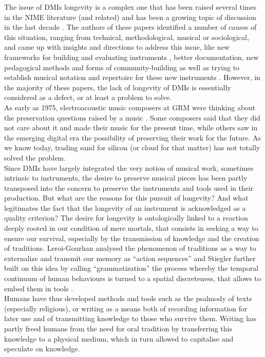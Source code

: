 The issue of DMIs longevity is a complex one that has been raised several times in the \gls{NIME} literature (and related) and has been a growing topic of discussion in the last decade \cite{baguyos_contemporary_2014}\cite{morreale_design_2017}. The authors of these papers identified a number of causes of this situation, ranging from technical, methodological, musical or sociological, and came up with insights and directions to address this issue, like new frameworks for building and evaluating instruments  \cite{jorda_digital_2004} \cite{morreale_design_2017}, better documentation, new pedagogical methods and forms of community-building as well as trying to establish musical notation and repertoire for these new instruments \cite{mamedes_composing_2014}\cite{mays_notation_2014}. However, in the majority of these papers, the lack of longevity of DMIs is essentially considered as a defect, or at least a problem to solve.\\
\indent As early as 1975, electroacoustic music composers at \gls{GRM} were thinking about the preservation questions raised by a music . Some composers said that they did not care about it and made their music for the present time, while others saw in the emerging digital era the possibility of preserving their work for the future. As we know today, trading sand for silicon (or cloud for that matter) has not totally solved the problem.\\
\indent Since DMIs have largely integrated the very notion of musical work, sometimes intrinsic to instruments, the desire to preserve musical pieces has been partly transposed into the concern to preserve the instruments and tools used in their production. But what are the reasons for this pursuit of longevity? And what legitimates the fact that the longevity of an instrument is acknowledged as a quality criterion? 
\indent The desire for longevity is ontologically linked to a reaction deeply rooted in our condition of mere mortals, that consists in seeking a way to ensure our survival, especially by the transmission of knowledge and the creation of traditions. Leroi-Gourhan analysed the phenomenon of traditions as a way to externalize and transmit our memory as “action sequences” \cite{leroi-gourhan_geste_1964} and Stiegler further built on this idea by calling “grammatization” the process whereby the temporal continuum of human behaviours is turned to a spatial discreteness, that allows to embed them in tools \cite{stiegler_for_2010}.\\
\indent Humans have thus developed methods and tools such as the psalmody of texts (especially religious), or writing as a means both of recording information for later use and of transmitting knowledge to those who survive them. Writing has partly freed humans from the need for oral tradition by transferring this knowledge to a physical medium, which in turn allowed to capitalise and speculate on knowledge.\\
